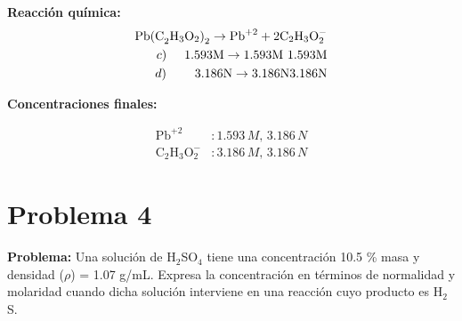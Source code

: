 \documentclass{article}
\begin{document}
\begin{multicols}{2}
\textbf{Reacción química:}
\begin{align*}
    \text{Pb(C}_2\text{H}_3\text{O}_2\text{)}_2 \rightarrow \text{Pb}^{+2} + 2\text{C}_2\text{H}_3\text{O}_2^{-} \\
    c) \hspace{0.5cm} \text{1.593M} \rightarrow \text{1.593M } \text{1.593M} \\
    d) \hspace{0.8cm} \text{3.186N} \rightarrow \text{3.186N} \text{3.186N}
\end{align*}

\textbf{Concentraciones finales:}

\begin{align*}
    \text{Pb}^{+2} &: 1.593 \, M, \, 3.186 \, N \\[10pt]
    \text{C}_2\text{H}_3\text{O}_2^{-} &: 3.186 \, M, \, 3.186 \, N
\end{align*}

\end{multicols} %









\newpage
\section*{Problema 4}
\textbf{Problema:} Una solución de H$_2$SO$_4$ tiene una concentración 10.5 \% masa y densidad ($\rho$) = 1.07 g/mL. Expresa la concentración en términos de normalidad y molaridad cuando dicha solución interviene en una reacción cuyo producto es H$_2$S.
\end{document}
